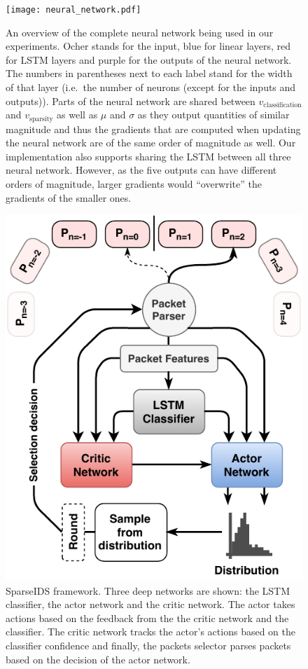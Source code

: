 \documentclass[conference]{IEEEtran}
\newcommand\note[2]{{\color{#1}#2}}
\begin{document}
\begin{figure}[h]
\centering
  \texttt{[image: neural\_network.pdf]}
  \caption{An overview of the complete neural network being used in our experiments. Ocher stands for the input, blue for linear layers, red for LSTM layers and purple for the outputs of the neural network. The numbers in parentheses next to each label stand for the width of that layer (i.e.~the number of neurons (except for the inputs and outputs)). Parts of the neural network are shared between $v_\text{classification}$ and $v_\text{sparsity}$ as well as $\mu$ and $\sigma$ as they output quantities of similar magnitude and thus the gradients that are computed when updating the neural network are of the same order of magnitude as well. Our implementation also supports sharing the LSTM between all three neural network. However, as the five outputs can have different orders of magnitude, larger gradients would ``overwrite'' the gradients of the smaller ones.}
  \label{fig:neuralNetworkArchitecture}
\end{figure}


\begin{figure}[h]
\centering
  \includegraphics[width=0.8\columnwidth]{img/rnn-sampling.pdf}
  \caption{SparseIDS framework. Three deep networks are shown: the LSTM classifier, the actor network and the critic network. The actor takes actions based on the feedback from the the critic network and the classifier. The critic network tracks the actor's actions based on the classifier confidence and finally, the packets selector parses packets based on the decision of the actor network.}
  \label{fig:sampling}
\end{figure}
\end{document}
